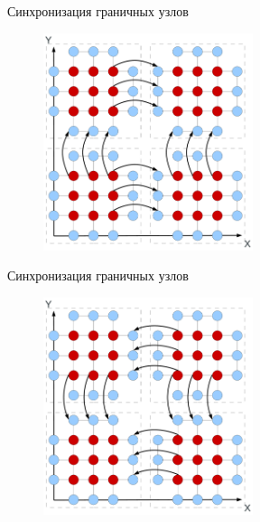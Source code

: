 \begin{frame}{Синхронизация граничных узлов}

\begin{figure}
\centering
\includegraphics[height=2.5in]{artwork/pdf/decomp_3}
\end{figure}

\end{frame}


\begin{frame}{Синхронизация граничных узлов}

\begin{figure}
\centering
\includegraphics[height=2.5in]{artwork/pdf/decomp_4}
\end{figure}

\end{frame}